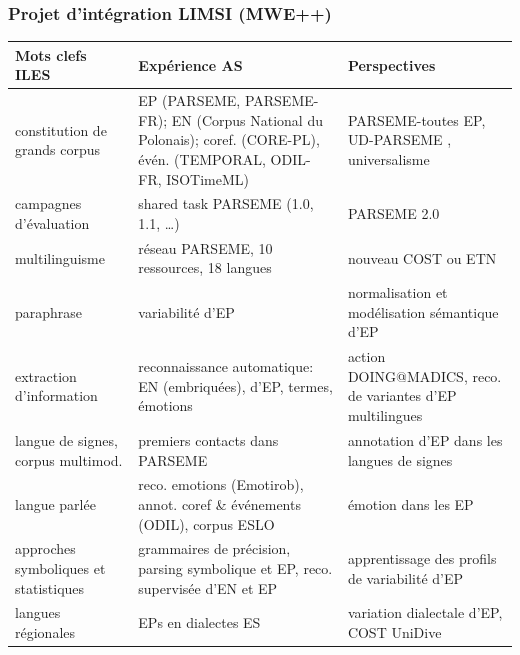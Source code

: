 \documentclass[xcolor=dvipsnames]{beamer}
\begin{document}
\begin{frame}
   \frametitle{Projet d'intégration LIMSI (MWE++)}

\begin{scriptsize}
\setlength{\tabcolsep}{0.3mm}
\begin{tabular}{|p{2.2cm}|p{5cm}|p{3.5cm}|}
\hline
\textbf{Mots clefs ILES} & \textbf{Expérience AS} & \textbf{Perspectives}\\\hline
constitution de grands corpus & EP (PARSEME, PARSEME-FR); EN (Corpus National du Polonais); coref. (CORE-PL), évén. (TEMPORAL, ODIL-FR, ISOTimeML)  & PARSEME-toutes EP, UD-PARSEME , universalisme\\\hline
campagnes d'évaluation & shared task PARSEME (1.0, 1.1, \ldots) & PARSEME 2.0\\\hline
multilinguisme & réseau PARSEME, 10 ressources, 18 langues & nouveau COST ou ETN\\\hline
paraphrase & variabilité d'EP & normalisation et modélisation sémantique d'EP \\\hline
extraction d'information & reconnaissance automatique: EN (embriquées), d'EP, termes, émotions & action DOING@MADICS, reco. de variantes d'EP multilingues \\\hline
langue de signes, corpus multimod. & premiers contacts dans PARSEME & annotation d'EP dans les langues de signes \\\hline
langue parlée & reco. emotions (Emotirob), annot. coref \& événements (ODIL), corpus ESLO & émotion dans les EP \\\hline
approches symboliques et statistiques & grammaires de précision, parsing symbolique et EP, reco. supervisée d'EN et EP & apprentissage des profils de variabilité d'EP \\\hline
langues régionales & EPs en dialectes ES & variation dialectale d'EP, COST UniDive\\\hline
\end{tabular}
\end{scriptsize}

\end{frame}
\end{document}
